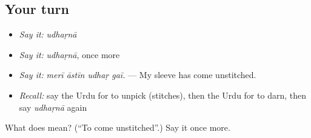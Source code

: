 \subsection*{Your turn}
\begin{itemize}
\raggedright
  \item \emph{Say it:} \emph{udhaṛnā}
  \item \emph{Say it:} \emph{udhaṛnā}, once more
  \item \emph{Say it:} \emph{merī āstīn udhaṛ gaī.} — My sleeve has come unstitched.
  \item \emph{Recall:} say the Urdu for to unpick (stitches), then the Urdu for to darn, then say \emph{udhaṛnā} again
\end{itemize}

\begin{tcolorbox}[breakable,colback=teal!4,colframe=teal!35!black,title={Before you move on}]
What does  mean? (\textquotedblleft{}To come unstitched\textquotedblright{}.) Say it once more.
\end{tcolorbox}
